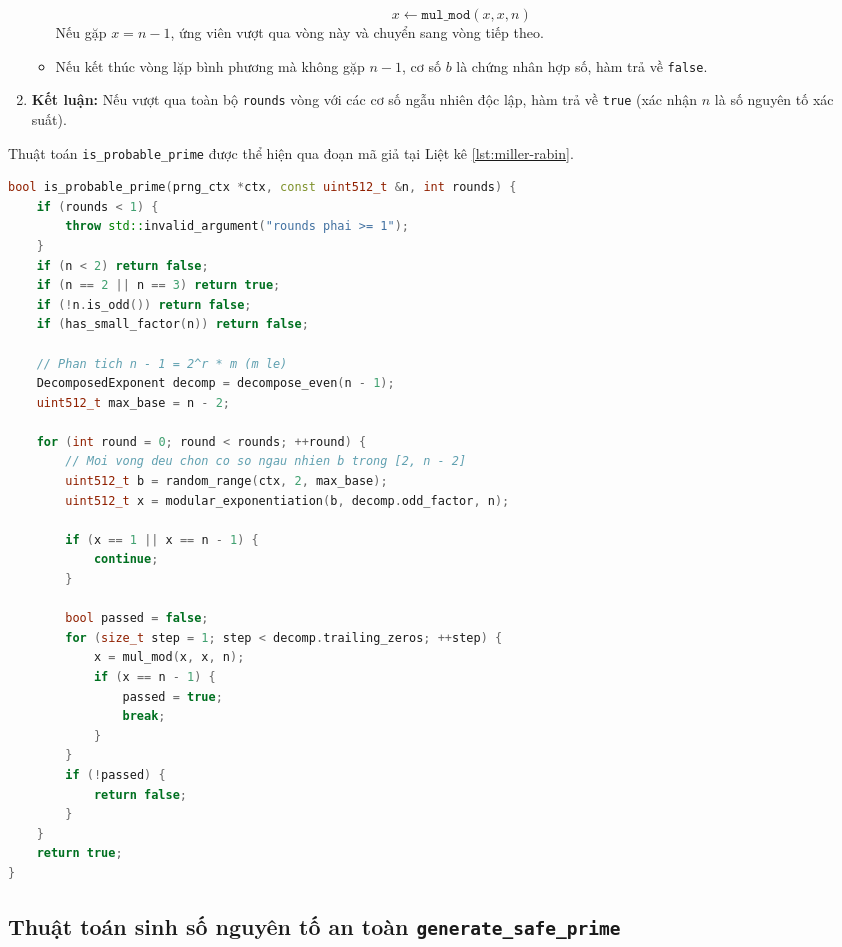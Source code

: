 \begin{enumerate}
\begin{itemize}
        $$x \leftarrow \texttt{mul\_mod}(x, x, n)$$
        Nếu gặp $x = n - 1$, ứng viên vượt qua vòng này và chuyển sang vòng tiếp theo.
        \item Nếu kết thúc vòng lặp bình phương mà không gặp $n - 1$, cơ số $b$ là chứng nhân hợp số, hàm trả về \texttt{false}.
    \end{itemize}
    \item \textbf{Kết luận:} Nếu vượt qua toàn bộ \texttt{rounds} vòng với các cơ số ngẫu nhiên độc lập, hàm trả về \texttt{true} (xác nhận $n$ là số nguyên tố xác suất).
\end{enumerate}

Thuật toán \texttt{is\_probable\_prime} được thể hiện qua đoạn mã giả tại Liệt kê \ref{lst:miller-rabin}.

\begin{lstlisting}[language=C++, caption={Thuật toán kiểm tra nguyên tố Miller-Rabin trong \texttt{prime.cpp}}, label={lst:miller-rabin}]
bool is_probable_prime(prng_ctx *ctx, const uint512_t &n, int rounds) {
    if (rounds < 1) {
        throw std::invalid_argument("rounds phai >= 1");
    }
    if (n < 2) return false;
    if (n == 2 || n == 3) return true;
    if (!n.is_odd()) return false;
    if (has_small_factor(n)) return false;

    // Phan tich n - 1 = 2^r * m (m le)
    DecomposedExponent decomp = decompose_even(n - 1);
    uint512_t max_base = n - 2;

    for (int round = 0; round < rounds; ++round) {
        // Moi vong deu chon co so ngau nhien b trong [2, n - 2]
        uint512_t b = random_range(ctx, 2, max_base);
        uint512_t x = modular_exponentiation(b, decomp.odd_factor, n);

        if (x == 1 || x == n - 1) {
            continue;
        }

        bool passed = false;
        for (size_t step = 1; step < decomp.trailing_zeros; ++step) {
            x = mul_mod(x, x, n);
            if (x == n - 1) {
                passed = true;
                break;
            }
        }
        if (!passed) {
            return false;
        }
    }
    return true;
}
\end{lstlisting}

\subsection{Thuật toán sinh số nguyên tố an toàn \texttt{generate\_\allowbreak{}safe\_\allowbreak{}prime}}

